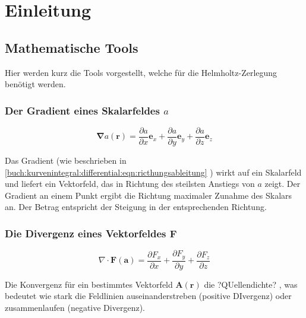 %
%
%
%
\section{Einleitung\label{helmholtz:section:teil0}}

\subsection{Mathematische Tools}

Hier werden kurz die Tools vorgestellt, welche für die Helmholtz-Zerlegung benötigt werden.

\subsubsection{Der Gradient eines Skalarfeldes $a$}
\begin{equation}
\mathbf{\nabla} a (\mathbf{r}) = \frac{\partial a}{\partial x}\mathbf{e}_x + \frac{\partial a}{\partial y}\mathbf{e}_y + \frac{\partial a}{\partial z}\mathbf{e}_z
\end{equation}

Das Gradient (wie beschrieben in  \eqref{buch:kurvenintegral:differential:eqn:ricthungsableitung} ) wirkt auf ein Skalarfeld und liefert ein Vektorfeld, das in Richtung des steilsten Anstiegs von $a$ zeigt. Der Gradient an einem Punkt ergibt die Richtung maximaler Zunahme des Skalars an. Der Betrag entspricht der Steigung in der entsprechenden Richtung. \newline



\subsubsection{Die Divergenz eines Vektorfeldes $\mathbf{F}$}
\begin{equation}
\nabla \cdot \mathbf{F}(\mathbf{a}) = \frac{\partial F_x}{\partial x} + \frac{\partial F_y}{\partial y} + \frac{\partial F_z}{\partial z}
\end{equation}

Die Konvergenz für ein bestimmtes Vektorfeld $\mathbf{A}(\mathbf{r})$ die ?QUellendichte? , was bedeutet wie stark die Feldlinien auseinanderstreben (positive DIvergenz) oder zusammenlaufen (negative Divergenz). \newline

